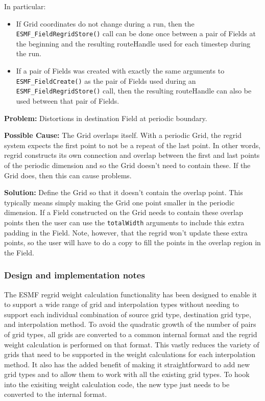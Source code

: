  \smallskip

 In particular:
 \begin{itemize}

 \item If Grid coordinates do not change during a run, then the {\tt ESMF\_FieldRegridStore()} call can be
 done once between a pair of Fields at the beginning and the resulting routeHandle used for each 
 timestep during the run. 

 \item If a pair of Fields was created with exactly the same arguments to {\tt ESMF\_FieldCreate()} as the 
 pair of Fields used during an {\tt ESMF\_FieldRegridStore()} call, then the resulting routeHandle can 
 also be used between that pair of Fields. 
 \end{itemize}

 \bigskip
 
 {\bf Problem:} Distortions in destination Field at periodic boundary.

 \medskip

 {\bf Possible Cause:} The Grid overlaps itself. With a periodic Grid, the regrid system expects
  the first point to not be a repeat of the last point. In other words,
  regrid constructs its own connection and overlap between the first and last points of the
  periodic dimension and so the Grid doesn't need to contain these. If the Grid does, then this
  can cause problems. 

 \smallskip

 {\bf Solution:} Define the Grid so that it doesn't contain the overlap point. This typically means simply making
 the Grid one point smaller in the periodic dimension.  If a Field 
 constructed on the Grid needs to contain these overlap points then the user can use the
 {\tt totalWidth} arguments to include this extra padding in the Field. Note, however, 
 that the regrid won't update these extra points, so the user will have to do a copy to fill the points
 in the overlap region in the Field.  

\subsubsection{Design and implementation notes}

The ESMF regrid weight calculation functionality has been designed to enable it to support a wide range
of grid and interpolation types without needing to support each individual combination of source grid type,
destination grid type, and interpolation method. To avoid the quadratic growth of the number of pairs
of grid types, all grids are converted to a common internal format and the regrid weight calculation
is performed on that format. This vastly reduces the variety of grids that need to be supported in 
the weight calculations for each interpolation method. It also has the added benefit of making it
straightforward to add new grid types and to allow them to work with all the existing grid types.
To hook into the exisiting weight calculation code, the new type just needs to be converted to the
internal format. 

